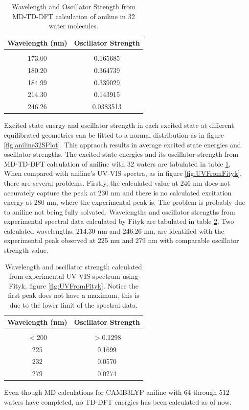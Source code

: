 \documentclass[
journal=jpcbfk, %
manuscript=article]{achemso}
\begin{document}

\begin{table}[ht]
	\caption{Wavelength and Oscillator Strength from MD-TD-DFT calculation of aniline in 32 water molecules.}
	\label{table:aniline32TD-DFTTable}
	\centering
	\begin{tabular}{c c}
		Wavelength (nm) & Oscillator Strength\\ [1ex] %
		\hline\hline
		\\[-0.5ex]
		173.00&0.165685\\
		180.20&0.364739 \\
		184.99&0.339029\\
		214.30&0.143915\\
		246.26&0.0383513\\ [1ex]
	\end{tabular}
\end{table}

Excited state energy and oscillator strength in each excited state at different equilibrated geometries can be fitted to a normal distribution as in figure \ref{fig:aniline32SPlot}. This appraoch results in average excited state energies and oscillator strengths. The excited state energies and its oscillator strength from MD-TD-DFT calculation of aniline with 32 waters are tabulated in table \ref{table:aniline32TD-DFTTable}. When compared with aniline's UV-VIS spectra, as in figure \ref{fig:UVFromFityk}, there are several problems. Firstly, the calculated value at 246 nm does not accurately capture the peak at 230 nm and there is no calculated excitation energy at 280 nm, where the experimental peak is. The problem is probably due to aniline not being fully solvated. Wavelengths and oscillator strengths from experimental spectral data calculated by Fityk are tabulated in table \ref{table:anilineUVTable}. Two calculated wavelengths, 214.30 nm and 246.26 nm, are identified with the experimental peak observed at 225 nm and 279 nm with comparable oscillator strength value. 
\begin{table}[ht]
	\caption{Wavelength and oscillator strength calculated from experimental UV-VIS spectrum using Fityk, figure \ref{fig:UVFromFityk}. Notice the first peak does not have a maximum, this is due to the lower limit of the spectral data.}
	\label{table:anilineUVTable}
	\centering
	\begin{tabular}{c c}
		Wavelength (nm) & Oscillator Strength\\ [1ex] %
		\hline\hline
		\\[-0.5ex]
		$<$200&$>$0.1298\\ 
		225&0.1699\\
		232&0.0570\\
		279&0.0274\\ 
	\end{tabular}
\end{table}
Even though MD calculations for CAMB3LYP aniline with 64 through 512 waters have completed, no TD-DFT energies has been calculated as of now. 
\end{document}
